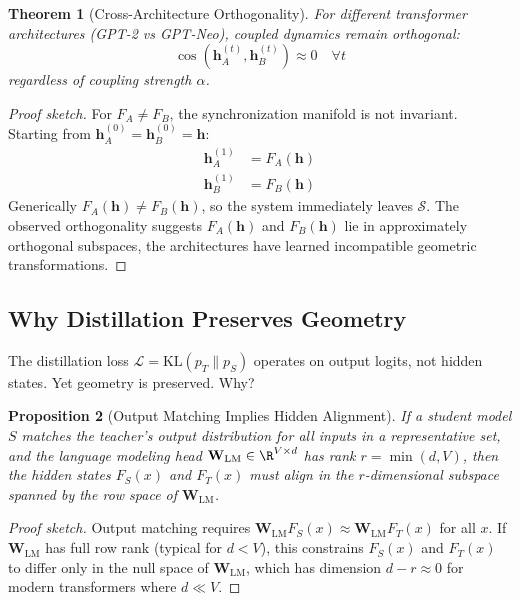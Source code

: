 \documentclass[10pt]{article} %
\theoremstyle{plain}
\newtheorem{theorem}{Theorem}[section]
\newtheorem{proposition}[theorem]{Proposition}
\theoremstyle{definition}
\theoremstyle{remark}
\newcommand{\cS}{\mathcal{S}}
\newcommand{\vect}[1]{\bm{#1}}
\newcommand{\mat}[1]{\mathbf{#1}}
\begin{document}
\begin{theorem}[Cross-Architecture Orthogonality]
For different transformer architectures (GPT-2 vs GPT-Neo), coupled dynamics remain orthogonal:
\begin{equation}
    \cos(\vect{h}_A^{(t)}, \vect{h}_B^{(t)}) \approx 0 \quad \forall t
\end{equation}
regardless of coupling strength $\alpha$.
\end{theorem}

\begin{proof}[Proof sketch]
For $F_A \neq F_B$, the synchronization manifold is not invariant. Starting from $\vect{h}_A^{(0)} = \vect{h}_B^{(0)} = \vect{h}$:
\begin{align}
    \vect{h}_A^{(1)} &= F_A(\vect{h}) \\
    \vect{h}_B^{(1)} &= F_B(\vect{h})
\end{align}
Generically $F_A(\vect{h}) \neq F_B(\vect{h})$, so the system immediately leaves $\cS$. The observed orthogonality suggests $F_A(\vect{h})$ and $F_B(\vect{h})$ lie in approximately orthogonal subspaces, the architectures have learned incompatible geometric transformations.
\end{proof}

\subsection{Why Distillation Preserves Geometry}

The distillation loss $\mathcal{L} = \text{KL}(p_T \| p_S)$ operates on output logits, not hidden states. Yet geometry is preserved. Why?

\begin{proposition}[Output Matching Implies Hidden Alignment]
If a student model $S$ matches the teacher's output distribution for all inputs in a representative set, and the language modeling head $\mat{W}_{\text{LM}} \in \R^{V \times d}$ has rank $r = \min(d, V)$, then the hidden states $F_S(x)$ and $F_T(x)$ must align in the $r$-dimensional subspace spanned by the row space of $\mat{W}_{\text{LM}}$.
\end{proposition}

\begin{proof}[Proof sketch]
Output matching requires $\mat{W}_{\text{LM}} F_S(x) \approx \mat{W}_{\text{LM}} F_T(x)$ for all $x$. If $\mat{W}_{\text{LM}}$ has full row rank (typical for $d < V$), this constrains $F_S(x)$ and $F_T(x)$ to differ only in the null space of $\mat{W}_{\text{LM}}$, which has dimension $d - r \approx 0$ for modern transformers where $d \ll V$.
\end{proof}
\end{document}
